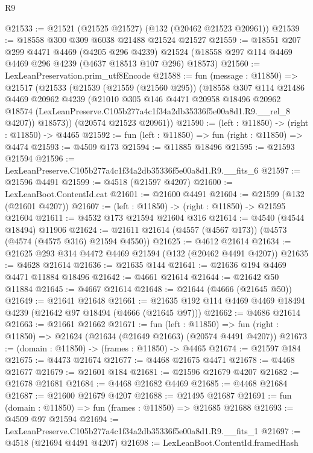 \begin{lexlean}{R9}
\begin{coremodule}
@21533 := @21521 (@21525 @21527) (@132 (@20462 @21523 @20961))
@21539 := @18558 @300 @309 @6038 @21488 @21524 @21527
@21559 := @18551
    @207
    @299
    @4471
    @4469
    (@4205 @296 @4239)
    @21524
    (@18558 @297 @114 @4469 @4469 @296 @4239 (@4637 @18513 @107 @296) @18573)
@21560 := LexLeanPreservation.prim_utf8Encode
@21588 := fun (message : @11850) =>
  @21517
    (@21533
      (@21539
        (@21559 (@21560 @295))
        (@18558
          @307
          @114
          @21486
          @4469
          @20962
          @4239
          (@21010
            @305
            @146
            @4471
            @20958
            @18496
            @20962
            @18574
            (LexLeanPreserve.C105b277a4c1f34a2db35336f5e00a8d1.R9.__rel_8 @4207))
          @18573))
      (@20574 @21523 @20961))
@21590 := (left : @11850) -> (right : @11850) -> @4465
@21592 := fun (left : @11850) => fun (right : @11850) => @4474
@21593 := @4509 @173
@21594 := @11885 @18496
@21595 := @21593 @21594
@21596 := LexLeanPreserve.C105b277a4c1f34a2db35336f5e00a8d1.R9.__fits_6
@21597 := @21596 @4491
@21599 := @4518 (@21597 @4207)
@21600 := LexLeanBoot.ContentId.cat
@21601 := @21600 @4491
@21604 := @21599 (@132 (@21601 @4207))
@21607 := (left : @11850) -> (right : @11850) -> @21595 @21604
@21611 := @4532 @173 @21594 @21604 @316
@21614 := @4540 (@4544 @18494) @11906
@21624 := @21611 @21614 (@4557 (@4567 @173)) (@4573 (@4574 (@4575 @316) @21594 @4550))
@21625 := @4612 @21614
@21634 := @21625 @293 @314 @4472 @4469 @21594 (@132 (@20462 @4491 @4207))
@21635 := @4628 @21614
@21636 := @21635 @144
@21641 := @21636 @194 @4469 @4471 @11884 @18496
@21642 := @4661 @21614
@21644 := @21642 @50 @11884
@21645 := @4667 @21614
@21648 := @21644 (@4666 (@21645 @50))
@21649 := @21641 @21648
@21661 := @21635 @192 @114 @4469 @4469 @18494 @4239 (@21642 @97 @18494 (@4666 (@21645 @97)))
@21662 := @4686 @21614
@21663 := @21661 @21662
@21671 := fun (left : @11850) =>
  fun (right : @11850) => @21624 (@21634 (@21649 @21663) (@20574 @4491 @4207))
@21673 := (domain : @11850) -> (frames : @11850) -> @4465
@21674 := @21597 @184
@21675 := @4473 @21674
@21677 := @4468 @21675 @4471
@21678 := @4468 @21677
@21679 := @21601 @184
@21681 := @21596 @21679 @4207
@21682 := @21678 @21681
@21684 := @4468 @21682 @4469
@21685 := @4468 @21684
@21687 := @21600 @21679 @4207
@21688 := @21495 @21687
@21691 := fun (domain : @11850) => fun (frames : @11850) => @21685 @21688
@21693 := @4509 @97 @21594
@21694 := LexLeanPreserve.C105b277a4c1f34a2db35336f5e00a8d1.R9.__fits_1
@21697 := @4518 (@21694 @4491 @4207)
@21698 := LexLeanBoot.ContentId.framedHash

\end{coremodule}
\end{lexlean}
